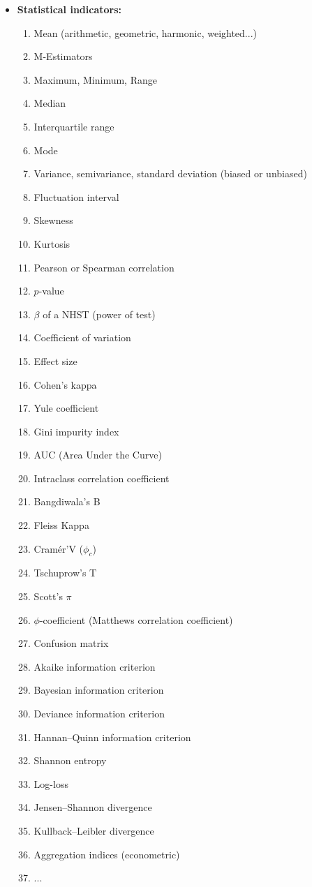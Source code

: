\begin{itemize}
		\item \textbf{Statistical indicators:}
		\begin{multicols}{2}
		\begin{enumerate}
			\item Mean (arithmetic, geometric, harmonic, weighted...)
			\item M-Estimators
			\item Maximum, Minimum, Range
			\item Median
			\item Interquartile range
			\item Mode
			\item Variance, semivariance, standard deviation (biased or unbiased)
			\item Fluctuation interval
			\item Skewness
			\item Kurtosis
			\item Pearson or Spearman correlation
			\item $p$-value
			\item $\beta$ of a NHST (power of test)
			\item Coefficient of variation
			\item Effect size
			\item Cohen's kappa
			\item Yule coefficient
			\item Gini impurity index
			\item AUC (Area Under the Curve)
			\item Intraclass correlation coefficient
			\item Bangdiwala's B
			\item Fleiss Kappa
			\item Cramér'V ($\phi_c$)
			\item Tschuprow's T 
			\item Scott's $\pi$
			\item $\phi$-coefficient (Matthews correlation coefficient)
			\item Confusion matrix
			\item Akaike information criterion
			\item Bayesian information criterion
			\item Deviance information criterion
			\item Hannan–Quinn information criterion
			\item Shannon entropy
			\item Log-loss
			\item Jensen–Shannon divergence
			\item Kullback–Leibler divergence
			\item Aggregation indices (econometric)
			\item ...
		\end{enumerate}
		\end{multicols}
		

\end{itemize}
